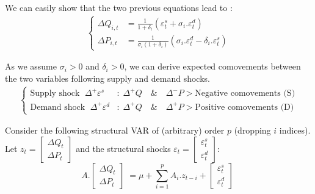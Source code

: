 \noindent We can easily show that the two previous equations lead to :
\begin{align*}
    \begin{cases}
        \Delta Q_{i,t} &= \frac{1}{1+\delta_{i}}(\varepsilon_{t}^{s} + \sigma_{i}.\varepsilon_{t}^{d}) \\
        \Delta P_{i,t} &= \frac{1}{\sigma_{i}(1+\delta_{i})}(\sigma_{i}.\varepsilon_{t}^{d} - \delta_{i}.\varepsilon_{t}^{s})
    \end{cases}
\end{align*}

\noindent As we assume $\sigma_{i}>0$ and $\delta_{i}>0$, we can derive expected comovements between the two variables following supply and demand shocks.
\begin{align*}
    \begin{cases}
        \textrm{Supply shock } \; \Delta^{+}\varepsilon^{s} &: \; \Delta^{+}Q \quad \textrm{\&} \quad \Delta^{-}P > \textrm{Negative comovements (S)}\\
        \textrm{Demand shock } \; \Delta^{+}\varepsilon^{d} &: \; \Delta^{+}Q \quad \textrm{\&} \quad \Delta^{+}P > \textrm{Positive comovements (D)}
    \end{cases}
\end{align*}


\noindent Consider the following structural VAR of (arbitrary) order $p$ (dropping $i$ indices). Let $z_{t} = \begin{bmatrix} \Delta Q_{t} \\ \Delta P_{t} \end{bmatrix}$ and the structural shocks $\varepsilon_{t} = \begin{bmatrix} \varepsilon_{t}^{s} \\ \varepsilon_{t}^{d} \end{bmatrix}$:
\vspace*{.5cm}
\[
    A.\begin{bmatrix} \Delta Q_{t} \\ \Delta P_{t} \end{bmatrix} \;
    = \mu + \sum_{i=1}^{p}A_{i}.z_{t-i} + \begin{bmatrix} \varepsilon_{t}^{s} \\ \varepsilon_{t}^{d} \end{bmatrix}\;
\]

